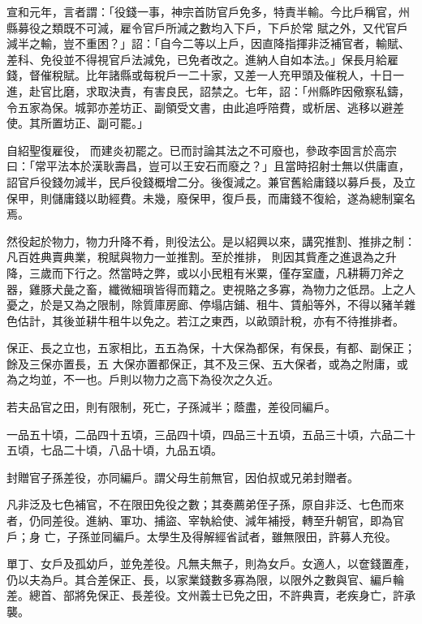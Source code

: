\begin{pinyinscope}
 宣和元年，言者謂：「役錢一事，神宗首防官戶免多，特責半輸。今比戶稱官，州縣募役之類既不可減，雇令官戶所減之數均入下戶，下戶於常
 賦之外，又代官戶減半之輸，豈不重困？」詔：「自今二等以上戶，因直降指揮非泛補官者，輸賦、差科、免役並不得視官戶法減免，已免者改之。進納人自如本法。」保長月給雇錢，督催稅賦。比年諸縣或每稅戶一二十家，又差一人充甲頭及催稅人，十日一進，赴官比磨，求取決責，有害良民，詔禁之。七年，詔：「州縣昨因儆察私鑄，令五家為保。城郭亦差坊正、副領受文書，由此追呼陪費，或析居、逃移以避差使。其所置坊正、副可罷。」



 自紹聖復雇役，
 而建炎初罷之。已而討論其法之不可廢也，參政李固言於高宗曰：「常平法本於漢耿壽昌，豈可以王安石而廢之？」且當時招射士無以供庸直，詔官戶役錢勿減半，民戶役錢概增二分。後復減之。兼官舊給庸錢以募戶長，及立保甲，則儲庸錢以助經費。未幾，廢保甲，復戶長，而庸錢不復給，遂為總制窠名焉。



 然役起於物力，物力升降不肴，則役法公。是以紹興以來，講究推割、推排之制：凡百姓典賣典業，稅賦與物力一並推割。至於推排，
 則因其貲產之進退為之升降，三歲而下行之。然當時之弊，或以小民粗有米粟，僅存室廬，凡耕耨刀斧之器，雞豚犬彘之畜，纖微細瑣皆得而籍之。吏視賂之多寡，為物力之低昂。上之人憂之，於是又為之限制，除質庫房廊、停塌店鋪、租牛、賃船等外，不得以豬羊雜色估計，其後並耕牛租牛以免之。若江之東西，以畝頭計稅，亦有不待推排者。



 保正、長之立也，五家相比，五五為保，十大保為都保，有保長，有都、副保正；餘及三保亦置長，五
 大保亦置都保正，其不及三保、五大保者，或為之附庸，或為之均並，不一也。戶則以物力之高下為役次之久近。



 若夫品官之田，則有限制，死亡，子孫減半；蔭盡，差役同編戶。



 一品五十頃，二品四十五頃，三品四十頃，四品三十五頃，五品三十頃，六品二十五頃，七品二十頃，八品十頃，九品五頃。



 封贈官子孫差役，亦同編戶。謂父母生前無官，因伯叔或兄弟封贈者。



 凡非泛及七色補官，不在限田免役之數；其奏薦弟侄子孫，原自非泛、七色而來者，仍同差役。進納、軍功、捕盜、宰執給使、減年補授，轉至升朝官，即為官戶；身
 亡，子孫並同編戶。太學生及得解經省試者，雖無限田，許募人充役。



 單丁、女戶及孤幼戶，並免差役。凡無夫無子，則為女戶。女適人，以奩錢置產，仍以夫為戶。其合差保正、長，以家業錢數多寡為限，以限外之數與官、編戶輪差。總首、部將免保正、長差役。文州義士已免之田，不許典賣，老疾身亡，許承襲。




\end{pinyinscope}
